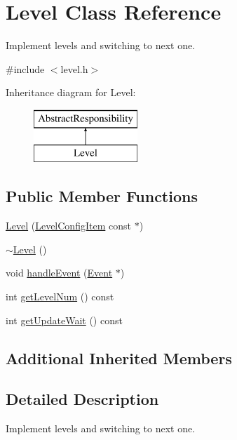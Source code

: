 \hypertarget{classLevel}{\section{Level Class Reference}
\label{classLevel}
}


Implement levels and switching to next one.  




{\ttfamily \#include $<$level.\-h$>$}

Inheritance diagram for Level\-:\begin{figure}[H]
\begin{center}
\leavevmode
\includegraphics[height=2.000000cm]{classLevel}
\end{center}
\end{figure}
\subsection*{Public Member Functions}
\begin{DoxyCompactItemize}
\item 
\hyperlink{classLevel_a1ad0ac0368b30dd5389761c44e6b42db}{Level} (\hyperlink{classLevelConfigItem}{Level\-Config\-Item} const $\ast$)
\item 
\hyperlink{classLevel_a249eac1e8f19ff44134efa5e986feaca}{$\sim$\-Level} ()
\item 
void \hyperlink{classLevel_a01a06c7956b2090df3efb6c2834a8ee0}{handle\-Event} (\hyperlink{classEvent}{Event} $\ast$)
\item 
int \hyperlink{classLevel_ac06e7d9fa248ce159a4489b9db2e9a72}{get\-Level\-Num} () const 
\item 
int \hyperlink{classLevel_a321e86205d65be219d52200e62ffde55}{get\-Update\-Wait} () const 
\end{DoxyCompactItemize}
\subsection*{Additional Inherited Members}


\subsection{Detailed Description}
Implement levels and switching to next one. 

